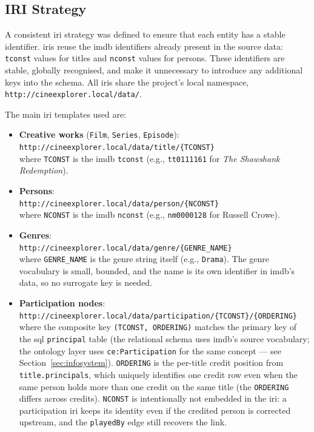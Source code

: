 \subsection{IRI Strategy}

A consistent \ac{iri} strategy was defined to ensure that each entity has a stable identifier. \acp{iri} reuse the \ac{imdb} identifiers already present in the source data: \texttt{tconst} values for titles and \texttt{nconst} values for persons. These identifiers are stable, globally recognised, and make it unnecessary to introduce any additional keys into the schema. All \acp{iri} share the project's local namespace, \texttt{http://cineexplorer.local/\allowbreak data/}.

The main \ac{iri} templates used are:

\begin{sloppypar}
\begin{itemize}
    \item \textbf{Creative works} (\texttt{Film}, \texttt{Series}, \texttt{Episode}):\\
\texttt{http://cineexplorer.local/data/title/\{TCONST\}}\\ where \texttt{TCONST} is the \ac{imdb} \texttt{tconst} (e.g., \texttt{tt0111161} for \emph{The Shawshank Redemption}).

    \item \textbf{Persons}:\\
\texttt{http://cineexplorer.local/data/person/\{NCONST\}}\\ where \texttt{NCONST} is the \ac{imdb} \texttt{nconst} (e.g., \texttt{nm0000128} for Russell Crowe).

    \item \textbf{Genres}:\\
\texttt{http://cineexplorer.local/data/genre/\{GENRE\_NAME\}}\\ where \texttt{GENRE\_NAME} is the genre string itself (e.g., \texttt{Drama}). The genre vocabulary is small, bounded, and the name is its own identifier in \ac{imdb}'s data, so no surrogate key is needed.

    \item \textbf{Participation nodes}:\\
\texttt{http://cineexplorer.local/data/\allowbreak participation/\{TCONST\}/\{ORDERING\}}\\ where the composite key \texttt{(TCONST, ORDERING)} matches the primary key of the \ac{sql} \texttt{principal} table (the relational schema uses \ac{imdb}'s source vocabulary; the ontology layer uses \texttt{ce:Participation} for the same concept --- see Section~\ref{sec:infosystem}). \texttt{ORDERING} is the per-title credit position from \texttt{title.principals}, which uniquely identifies one credit row even when the same person holds more than one credit on the same title (the \texttt{ORDERING} differs across credits). \texttt{NCONST} is intentionally not embedded in the \ac{iri}: a participation \ac{iri} keeps its identity even if the credited person is corrected upstream, and the \texttt{playedBy} edge still recovers the link.
\end{itemize}
\end{sloppypar}

